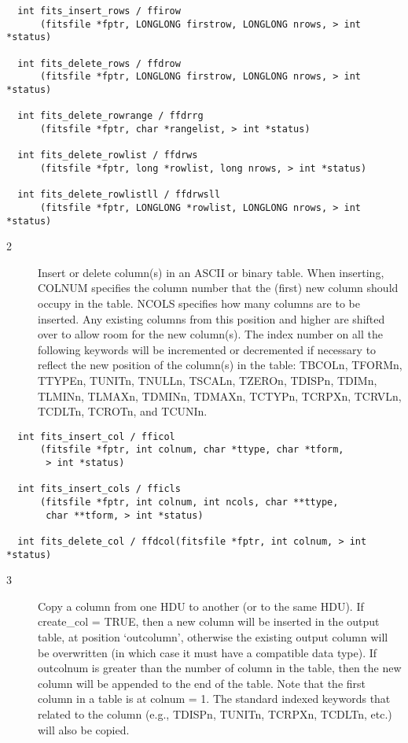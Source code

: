 \documentclass[11pt]{book}
\begin{document}
\begin{verbatim}
  int fits_insert_rows / ffirow
      (fitsfile *fptr, LONGLONG firstrow, LONGLONG nrows, > int *status)

  int fits_delete_rows / ffdrow
      (fitsfile *fptr, LONGLONG firstrow, LONGLONG nrows, > int *status)

  int fits_delete_rowrange / ffdrrg
      (fitsfile *fptr, char *rangelist, > int *status)

  int fits_delete_rowlist / ffdrws
      (fitsfile *fptr, long *rowlist, long nrows, > int *status)

  int fits_delete_rowlistll / ffdrwsll
      (fitsfile *fptr, LONGLONG *rowlist, LONGLONG nrows, > int *status)
\end{verbatim}

\begin{description}
\item[2 ] Insert or delete column(s) in an ASCII or binary
    table.  When inserting, COLNUM specifies the column number that the
    (first) new column should occupy in the table.  NCOLS specifies how
    many columns are to be inserted. Any existing columns from this
    position and higher are shifted over to allow room for the new
    column(s).  The index number on all the following keywords will be
    incremented or decremented if necessary to reflect the new position
    of the column(s) in the table:  TBCOLn, TFORMn, TTYPEn, TUNITn,
    TNULLn, TSCALn, TZEROn, TDISPn, TDIMn, TLMINn, TLMAXn, TDMINn,
    TDMAXn, TCTYPn, TCRPXn, TCRVLn, TCDLTn, TCROTn,
   and TCUNIn. \label{fficol} \label{fficls} \label{ffdcol}
\end{description}

\begin{verbatim}
  int fits_insert_col / fficol
      (fitsfile *fptr, int colnum, char *ttype, char *tform,
       > int *status)

  int fits_insert_cols / fficls
      (fitsfile *fptr, int colnum, int ncols, char **ttype,
       char **tform, > int *status)

  int fits_delete_col / ffdcol(fitsfile *fptr, int colnum, > int *status)
\end{verbatim}

\begin{description}
\item[3 ] Copy a column from one HDU to another (or to the same HDU).  If
    create\_col = TRUE, then a new column will be inserted in the output
    table, at position `outcolumn', otherwise the existing output column will
    be overwritten (in which case it must have a compatible data type).
    If outcolnum is greater than the number of column in the table, then
    the new column will be appended to the end of the table.
    Note that the first column in a table is at colnum = 1.
    The standard indexed keywords that related to the column (e.g., TDISPn,
   TUNITn, TCRPXn, TCDLTn, etc.) will also be copied. \label{ffcpcl}
\end{description}
\end{document}
